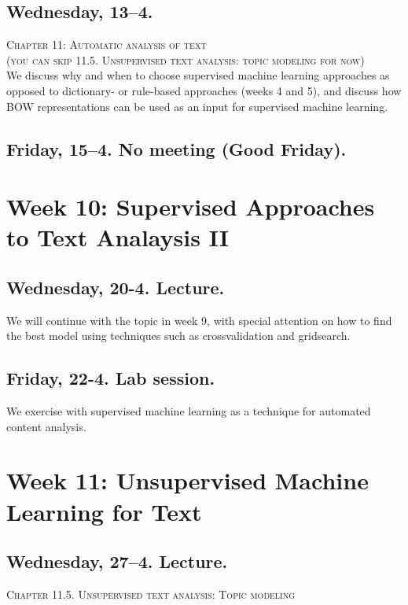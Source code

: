 \subsection*{Wednesday, 13--4.}
\textsc{ Chapter 11: Automatic analysis of text}\\
\textsc{ (you can skip 11.5. Unsupervised text analysis: topic modeling for now)}\\

We discuss why and when to choose supervised machine learning approaches as opposed to dictionary- or rule-based approaches (weeks 4 and 5), and discuss how BOW representations can be used as an input for supervised machine learning.

\subsection*{Friday, 15--4. No meeting (Good Friday).}




\section*{Week 10: Supervised Approaches to Text Analaysis II}

\subsection*{Wednesday, 20-4. Lecture.}
We will continue with the topic in week 9, with special attention on how to find the best model using techniques such as crossvalidation and gridsearch.

\subsection*{Friday, 22-4. Lab session.}
We exercise with supervised machine learning as a technique for automated content analysis.



\section*{Week 11: Unsupervised Machine Learning for Text}

\subsection*{Wednesday, 27--4. Lecture.}
\textsc{ Chapter 11.5. Unsupervised text analysis: Topic modeling}\\

